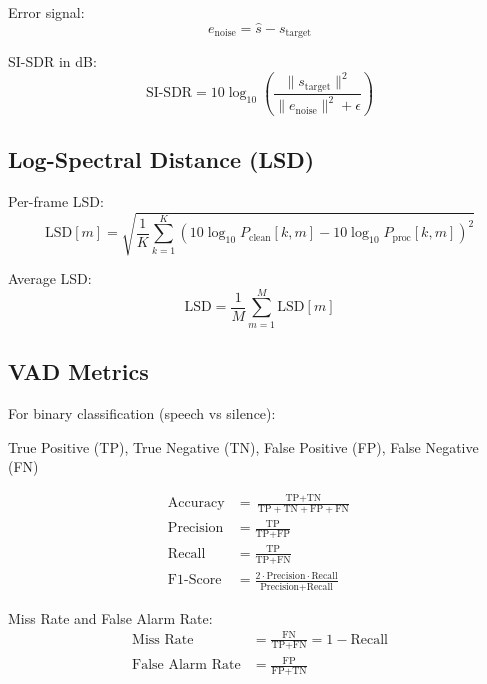 \documentclass[12pt,a4paper]{article}
\begin{document}
Error signal:
\begin{equation}
e_{\text{noise}} = \hat{s} - s_{\text{target}}
\end{equation}

SI-SDR in dB:
\begin{equation}
\text{SI-SDR} = 10 \log_{10} \left(\frac{\|s_{\text{target}}\|^2}{\|e_{\text{noise}}\|^2 + \epsilon}\right)
\end{equation}

\subsection{Log-Spectral Distance (LSD)}

Per-frame LSD:
\begin{equation}
\text{LSD}[m] = \sqrt{\frac{1}{K} \sum_{k=1}^{K} \left(10\log_{10}P_{\text{clean}}[k,m] - 10\log_{10}P_{\text{proc}}[k,m]\right)^2}
\end{equation}

Average LSD:
\begin{equation}
\text{LSD} = \frac{1}{M} \sum_{m=1}^{M} \text{LSD}[m]
\end{equation}

\subsection{VAD Metrics}

For binary classification (speech vs silence):

True Positive (TP), True Negative (TN), False Positive (FP), False Negative (FN)

\begin{align}
\text{Accuracy} &= \frac{\text{TP} + \text{TN}}{\text{TP} + \text{TN} + \text{FP} + \text{FN}} \\
\text{Precision} &= \frac{\text{TP}}{\text{TP} + \text{FP}} \\
\text{Recall} &= \frac{\text{TP}}{\text{TP} + \text{FN}} \\
\text{F1-Score} &= \frac{2 \cdot \text{Precision} \cdot \text{Recall}}{\text{Precision} + \text{Recall}}
\end{align}

Miss Rate and False Alarm Rate:
\begin{align}
\text{Miss Rate} &= \frac{\text{FN}}{\text{TP} + \text{FN}} = 1 - \text{Recall} \\
\text{False Alarm Rate} &= \frac{\text{FP}}{\text{FP} + \text{TN}}
\end{align}
\end{document}
